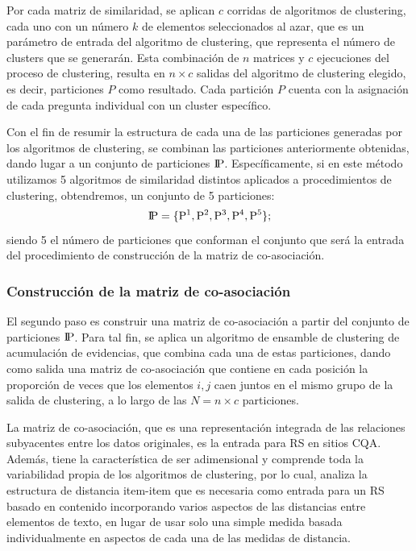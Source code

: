 \bigskip Por cada matriz de similaridad, se aplican \(c\) corridas de algoritmos de clustering, cada uno con un número \(k\) de elementos seleccionados al azar, que es un parámetro de entrada del algoritmo de clustering, que representa el número de clusters que se generarán. Esta combinación de \(n\) matrices y \(c\) ejecuciones del proceso de clustering, resulta en \(n \times c\) salidas del algoritmo de clustering elegido, es decir, particiones \(P\) como resultado. Cada partición \(P\) cuenta con la asignación de cada pregunta individual con un cluster específico.

\bigskip Con el fin de resumir la estructura de cada una de las particiones generadas por los algoritmos de clustering, se combinan las particiones anteriormente obtenidas, dando lugar a un conjunto de particiones  \(\rm I\!P\). Específicamente, si en este método utilizamos 5 algoritmos de similaridad distintos aplicados a procedimientos de clustering, obtendremos, un conjunto de 5 particiones:
\[\rm I\!P = \{P^1, P^2, P^3, P^4, P^5\};\]
siendo 5 el número de particiones que conforman el conjunto que será la entrada del procedimiento de construcción de la matriz de co-asociación.

\subsubsection{Construcción de la matriz de co-asociación}
El segundo paso es construir una matriz de co-asociación a partir del conjunto de particiones \(\rm I\!P\). Para tal fin, se aplica un algoritmo de ensamble de clustering de acumulación de evidencias, que combina cada una de estas particiones, dando como salida una matriz de co-asociación que contiene en cada posición la proporción de veces que los elementos \(i,j\) caen juntos en el mismo grupo de la salida de clustering, a lo largo de las \(N=n \times c\) particiones.

\bigskip La matriz de co-asociación, que es una representación integrada de las relaciones subyacentes entre los datos originales, es la entrada para RS en sitios CQA. Además, tiene la característica de ser adimensional y comprende toda la variabilidad propia de los algoritmos de clustering, por lo cual, analiza la estructura de distancia item-item que es necesaria como entrada para un RS basado en contenido incorporando varios aspectos de las distancias entre elementos de texto, en lugar de usar solo una simple medida basada individualmente en aspectos de cada una de las medidas de distancia.

